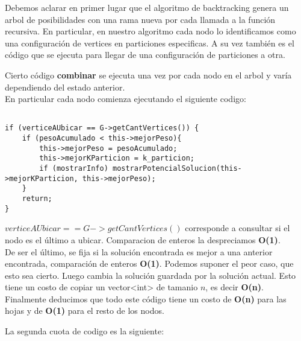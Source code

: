 

\noindent
Debemos aclarar en primer lugar que el algoritmo de backtracking genera un arbol de posibilidades con una rama nueva por cada llamada a la funci\'on recursiva. En particular, en nuestro algoritmo cada nodo lo identificamos como una configuraci\'on de vertices en particiones especificas. A su vez tambi\'en es el c\'odigo que se ejecuta para llegar de una configuraci\'on de particiones a otra.

\noindent
Cierto c\'odigo \textbf{combinar} se ejecuta una vez por cada nodo en el arbol y var\'ia dependiendo del estado anterior. \\
En particular cada nodo comienza ejecutando el siguiente codigo:

\begin{lstlisting}

if (verticeAUbicar == G->getCantVertices()) {
	if (pesoAcumulado < this->mejorPeso){
		this->mejorPeso = pesoAcumulado;
		this->mejorKParticion = k_particion;
		if (mostrarInfo) mostrarPotencialSolucion(this->mejorKParticion, this->mejorPeso);
	}
	return;
}
\end{lstlisting}

\noindent 
$verticeAUbicar == G->getCantVertices()$ corresponde a consultar si el nodo es el \'ultimo a ubicar. Comparacion de enteros la despreciamos \textbf{O(1)}.\\
De ser el \'ultimo, se fija si la soluci\'on encontrada es mejor a una anterior encontrada, comparaci\'on de enteros \textbf{O(1)}. Podemos suponer el peor caso, que esto sea cierto. Luego cambia la soluci\'on guardada por la soluci\'on actual. Esto tiene un costo de copiar un vector<int> de tamanio $n$, es decir \textbf{O(n)}.\\
Finalmente deducimos que todo este c\'odigo tiene un costo de \textbf{O(n)} para las hojas y de \textbf{O(1)} para el resto de los nodos.

\noindent 
La segunda cuota de codigo es la siguiente:

